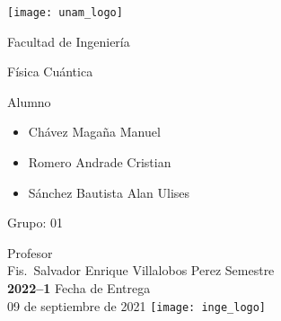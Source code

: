 \begin{titlepage}
  \centering
    \texttt{[image: unam\_logo]}\vspace{0.5cm}

    {\scshape{\Huge Facultad de Ingeniería\par{}}}\vspace{0.25cm}

    {\scshape{\Large Física Cuántica\par{}}}\vfill{}


    {\huge \textbf{\tituloTrabajo{}}}\vfill{}


    {\Large
      Alumno
      \begin{itemize}
        \item Chávez Magaña Manuel
        \item Romero Andrade Cristian
        \item Sánchez Bautista Alan Ulises
      \end{itemize}
    }\vfill{}

      {\large Grupo: 01\par{}}\vfill{}

    {\large Profesor\\Fis.~Salvador Enrique Villalobos Perez}\vfill{}
    \vfil{}
    {\large Semestre\\\textbf{2022--1}}
    \vfill{}
    {\large Fecha de Entrega\\09 de septiembre de 2021}
    \vfill{}
    \texttt{[image: inge\_logo]}

\end{titlepage}

